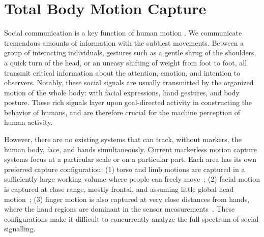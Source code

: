 
\chapter{Total Body Motion Capture}
\label{chapter:totalcapture}



Social communication is a key function of human motion \cite{Birdwhistell-1970}. We communicate tremendous amounts of information with the subtlest movements. Between a group of interacting individuals, gestures such as a gentle shrug of the shoulders, a quick turn of the head, or an uneasy shifting of weight from foot to foot, all transmit critical information about the attention, emotion, and intention to observers. Notably, these social signals are usually transmitted by the organized motion of the whole body: with facial expressions, hand gestures, and body posture. These rich signals layer upon goal-directed activity in constructing the behavior of humans, and are therefore crucial for the machine perception of human activity. 

However, there are no existing systems that can track, without markers, the human body, face, and hands simultaneously. Current markerless motion capture systems focus at a particular scale or on a particular part. Each area has its own preferred capture configuration: (1) torso and limb motions are captured in a sufficiently large working volume where people can freely move~\cite{de2008performance, Gall-09, Stoll-11, Elhayek-15}; (2) facial motion is captured at close range, mostly frontal, and assuming little global head motion~\cite{beeler2010high,ghosh2011multiview,Beeler2011, bradley2010high, valgaerts2012lightweight}; (3) finger motion is also captured at very close distances from hands, where the hand regions are dominant in the sensor measurements~\cite{Oikonomidis-12, Tompson-14a, Sridha-15, Tzionas-16}. These configurations make it difficult to concurrently analyze the full spectrum of social signalling.



